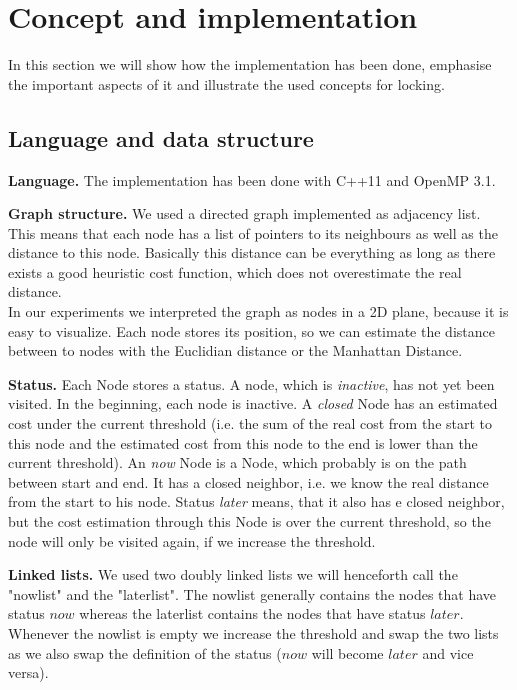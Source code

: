 \documentclass[letterpaper]{article}
\newcommand{\mypar}[1]{{\bf #1.}}
\begin{document}
\section{Concept and implementation}\label{sec:impl}

In this section we will show how the implementation has been done, emphasise the important aspects of it and illustrate the used concepts for locking.

\subsection{Language and data structure}\label{ssec:lang}

\mypar{Language}
The implementation has been done with C++11 and OpenMP 3.1.

\mypar{Graph structure}
We used a directed graph implemented as adjacency list. This means that each node has a list of pointers to its neighbours as well as the distance to this node. Basically this distance can be everything as long as there exists a good heuristic cost function, which does not overestimate the real distance. \\
In our experiments we interpreted the graph as nodes in a 2D plane, because it is easy to visualize. Each node stores its position, so we can estimate the distance between to nodes with the Euclidian distance or the Manhattan Distance.

\mypar{Status}
Each Node stores a status. A node, which is \textit{inactive}, has not yet been visited. In the beginning, each node is inactive. A \textit{closed} Node has an estimated cost under the current threshold (i.e. the sum of the real cost from the start to this node and the estimated cost from this node to the end is lower than the current threshold). An \textit{now} Node is a Node, which probably is on the path between start and end. It has a closed neighbor, i.e. we know the real distance from the start to his node. Status \textit{later} means, that it also has e closed neighbor, but the cost estimation through this Node is over the current threshold, so the node will only be visited again, if we increase the threshold.

\mypar{Linked lists}
We used two doubly linked lists we will henceforth call the "nowlist" and the "laterlist". The nowlist generally contains the nodes that have status $now$ whereas the laterlist contains the nodes that have status $later$. Whenever the nowlist is empty we increase the threshold and swap the two lists as we also swap the definition of the status ($now$ will become $later$ and vice versa). 
\end{document}
